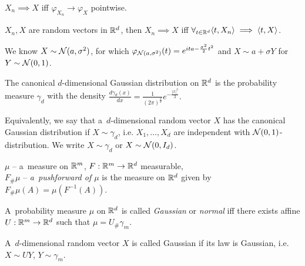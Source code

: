 



	\begin{theorem}
		$X_n \implies X$ iff $\varphi_{X_n} \to \varphi_X$ pointwise.
	\end{theorem}
	
	\begin{corollary}
		$X_n, X$ are random vectors in $\mathbb{R}^d$, then $X_n \implies X$ iff $\forall_{t \in \mathbb{R}^d} \langle t, X_n\rangle \implies \langle t,X\rangle$.
	\end{corollary}
	
	\begin{remark}
		We know $X \sim \mathcal{N}(a, \sigma^2)$, for which $\varphi_{\mathcal{N}(a,\sigma^2)}(t) = e^{ita - \frac{\sigma^2}{2} t^2}$ and $X \sim a + \sigma Y$ for $Y \sim \mathcal{N}(0,1)$.
	\end{remark}
	
	\begin{definition}
		The canonical $d$-dimensional Gaussian distribution on $\mathbb{R}^d$ is the probability measure $\gamma_d$ with the density $\displaystyle \frac{d \gamma_d(x)}{dx} = \frac{1}{(2 \pi)^{\frac{d}{2}}} e^{-\frac{|x|^2}{2}}.$
		
		Equivalently, we say that a~$d$-dimensional random vector $X$ has the canonical Gaussian distribution if $X \sim \gamma_d$, i.e. $X_1, \ldots, X_d$ are independent with $\mathcal{N}(0,1)$-distribution. We write $X \sim \gamma_d$ or $X \sim \mathcal{N}(0,I_d)$.
	\end{definition}
	
	\begin{definition}[pushforward]
		$\mu$ -- a~measure on $\mathbb{R}^m$, $F:\mathbb{R}^m \to \mathbb{R}^d$ measurable, \\ $F_\# \mu$ -- \emph{a~pushforward of $\mu$} is the measure on $\mathbb{R}^d$ given by $F_\# \mu(A) = \mu(F^{-1}(A))$.
	\end{definition}
	
	\begin{definition}
		A~probability measure $\mu$ on $\mathbb{R}^d$ is called \emph{Gaussian} or \emph{normal} iff there exists affine $U:\mathbb{R}^m \to \mathbb{R}^d$ such that $\mu = U_\# \gamma_m$.
		
		A~$d$-dimensional random vector $X$ is called Gaussian if its law is Gaussian, i.e. $X \sim U Y$, $Y \sim \gamma_m$.
	\end{definition}
	
